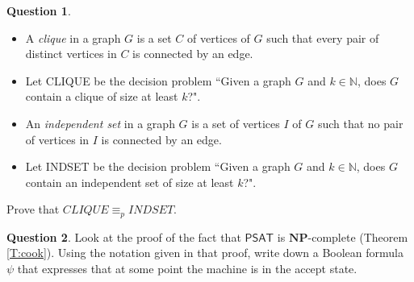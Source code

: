 \documentclass{article}
\theoremstyle{definition}
\newtheorem{Q}{Question}
\newcommand{\NP}{\mathbf{NP}}
\newcommand{\bbN}{\mathbb{N}}
\newcommand{\SAT}{\mathsf{PSAT}}
\begin{document}
\begin{Q}\mbox{}
\begin{itemize}
\item A \emph{clique} in a graph $G$ is a set $C$ of vertices of $G$ such that every pair of distinct vertices in $C$ is connected by an edge. 
\item Let CLIQUE be the decision problem ``Given a graph $G$ and $k\in \bbN$, does $G$ contain a clique of size at least $k$?".
\item An \emph{independent set} in a graph $G$ is a set of vertices $I$ of $G$ such that no pair of vertices in $I$ is connected by an edge.
\item Let INDSET be the decision problem ``Given a graph $G$ and $k\in \bbN$, does $G$ contain an independent set of size at least $k$?".   
\end{itemize}
Prove that $CLIQUE \equiv_p INDSET$.
\end{Q}
\begin{comment}
\textbf{Solution}
Given a graph $G$, define the graph $\bar{G}$ to have the same vertices as $G$, and say there is an edge $\{u,v\}$ in $\bar{G}$ if and only if there is not an edge $\{u,v\}$ in $G$. This construction clearly takes $p$-time. Moreover, a clique/independent set of size $k$ in $G$ is an independent set/clique of size $k$ in $\bar{G}$, and vice versa. So this transformation maps yes instance of CLIQUE to yes instances of INDSET, and vice versa. So $CLIQUE \leq_p INDSET$ and $INDSET\leq_p CLIQUE$. I.e. $CLIQUE \equiv_p INDSET$.  
\end{comment}

\begin{Q}
Look at the proof of the fact that $\SAT$ is $\NP$-complete (Theorem \ref{T:cook}). Using the notation given in that proof, write down a Boolean formula $\psi$ that expresses that at some point the machine is in the accept state.
\end{Q}
\begin{comment}
\textbf{Solution}
Let $A$ be the accept state. Then $\psi = \bigvee_{1\leq i,j\leq Cn^k} p_{i,j,A}$.
\end{comment}
\end{document}
